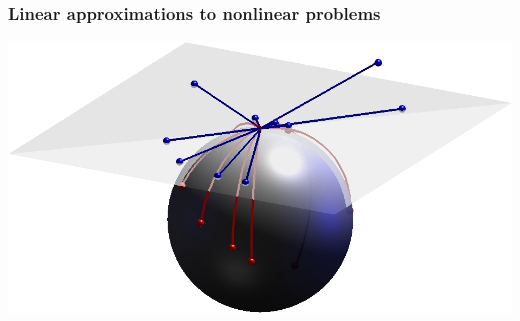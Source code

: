 \begin{frame}
\frametitle{Linear approximations to nonlinear problems}
\begin{center}
\includegraphics[width=\textwidth]{spheres}
\end{center}
\end{frame}

